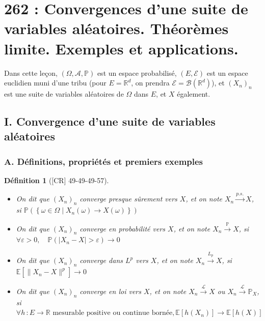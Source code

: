 \documentclass[10pt, a4paper, parskip=full, twoside, twocolumn]{report}
\newtheorem{definition}{Définition}
\newcommand{\IE}{\mathbb{E}}
\newcommand{\IR}{\mathbb{R}}
\newcommand{\B}{\mathcal{B}}
\newcommand{\A}{\mathscr{A}}
\begin{document}

\chapter*{262 : Convergences d’une suite de variables aléatoires. Théorèmes limite. Exemples et applications.}
\setcounter{definition}{0}

\textcolor{paragraphtext}{Dans cette leçon, $(\Omega, \A, \mathbb{P})$ est un espace probabilisé, $(E,\mathcal{E})$ est un espace euclidien muni d'une tribu (pour $E =\IR^d$, on prendra $\mathcal{E} = \B(\IR^d)$), et $\left(X_n\right)_{n}$ est une suite de variables aléatoires de $\Omega$ dans $E$, et $X$ également.}

\section*{I. Convergence d'une suite de variables aléatoires}
\subsection*{A. Définitions, propriétés et premiers exemples}

\begin{definition}[\textnormal{[CR] 49-49-49-57}]
	\begin{itemize}
		\item {On dit que $\left(X_n\right)_n$ 
		converge \emph{presque sûrement vers $X$}, et on note $X_n\xrightarrow{p.s.} X$, si
			$\mathbb{P}(\left\{\omega\in\Omega\mid X_n(\omega)\to X(\omega)\right\})$
		}
		\item{
			On dit que $\left(X_n\right)_n$ converge \emph{en probabilité vers $X$}, et on note $X_n\xrightarrow{\mathbb{P}} X$, si
			$\forall \varepsilon > 0,\quad \mathbb{P}(\lvert X_n - X\rvert > \varepsilon)\to 0$
		}
		\item {
			On dit que $\left(X_n\right)_n$ converge \emph{dans $L^p$ vers $X$}, et on note $X_n\xrightarrow{L_p} X$, si
			$\IE[\|X_n - X\|^p]\to 0$
		}
		\item {
			On dit que $\left(X_n\right)_n$ converge \emph{en loi vers $X$}, et on note $X_n\xrightarrow{\mathcal{L}} X$ ou $X_n\xrightarrow{\mathcal{L}} \mathbb{P}_X$, si
			$\forall h\,\colon E\to\IR\text{ mesurable positive ou continue bornée,}\, \IE[h(X_n)]\to \IE[h(X)]$
		}
	\end{itemize}
\end{definition}
\end{document}
